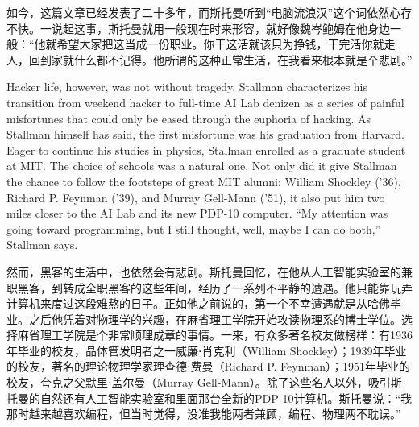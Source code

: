 \ifdefined\chs
如今，这篇文章已经发表了二十多年，而斯托曼听到``电脑流浪汉''这个词依然心存不快。一说起这事，斯托曼就用一般现在时来形容，就好像魏岑鲍姆在他身边一般：``他就希望大家把这当成一份职业。你干这活就该只为挣钱，干完活你就走人，回到家就什么都不记得。他所谓的这种正常生活，在我看来根本就是个悲剧。''
\fi

\ifdefined\eng
Hacker life, however, was not without tragedy. Stallman characterizes his transition from weekend hacker to full-time AI Lab denizen as a series of painful misfortunes that could only be eased through the euphoria of hacking. As Stallman himself has said, the first misfortune was his graduation from Harvard. Eager to continue his studies in physics, Stallman enrolled as a graduate student at MIT. The choice of schools was a natural one. Not only did it give Stallman the chance to follow the footsteps of great MIT alumni: William Shockley ('36), Richard P. Feynman ('39), and Murray Gell-Mann ('51), it also put him two miles closer to the AI Lab and its new PDP-10 computer. ``My attention was going toward programming, but I still thought, well, maybe I can do both,'' Stallman says.
\fi

\ifdefined\chs
然而，黑客的生活中，也依然会有悲剧。斯托曼回忆，在他从人工智能实验室的兼职黑客，到转成全职黑客的这些年间，经历了一系列不平静的遭遇。他只能靠玩弄计算机来度过这段难熬的日子。正如他之前说的，第一个不幸遭遇就是从哈佛毕业。之后他凭着对物理学的兴趣，在麻省理工学院开始攻读物理系的博士学位。选择麻省理工学院是个非常顺理成章的事情。一来，有众多著名校友做榜样：有1936年毕业的校友，晶体管发明者之一威廉⋅肖克利（William Shockley）；1939年毕业的校友，著名的理论物理学家理查德⋅费曼（Richard P. Feynman）；1951年毕业的校友，夸克之父默里⋅盖尔曼（Murray Gell-Mann）。除了这些名人以外，吸引斯托曼的自然还有人工智能实验室和里面那台全新的PDP-10计算机。斯托曼说：``我那时越来越喜欢编程，但当时觉得，没准我能两者兼顾，编程、物理两不耽误。''
\fi

